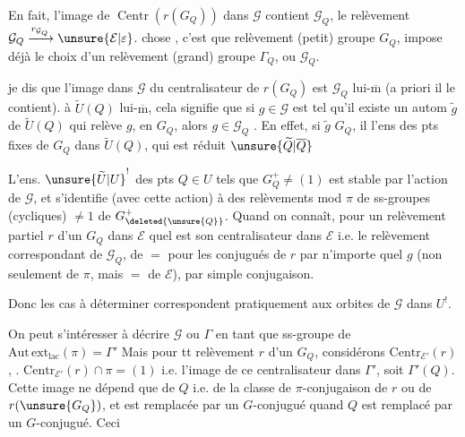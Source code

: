 En fait, l'image de $\operatorname{Centr}(r(G_Q))$ dans $\mathcal G$ contient $\mathcal G_Q$,    le relèvement $\mathcal G_Q\xrightarrow{r_{\mathcal G_Q}}\unsure{\mathcal E|\varepsilon}$.
 chose , c'est que   relèvement  (petit) groupe $G_Q$, impose déjà le choix d'un relèvement  (grand) groupe $\Gamma_Q$, ou $\mathcal G_Q$.

 je dis que l'image dans $\mathcal G$ du centralisateur  de $r(G_Q)$ est $\mathcal G_Q$ lui-$\overline{\mathrm m}$ (a priori il le contient).
 à $\widetilde U(Q)$ lui-$\overline{\mathrm m}$, cela signifie que  si $g\in\mathcal G$ est tel qu'il existe un autom $\widetilde g$ de $\widetilde U(Q)$ qui relève $g$, en     $G_Q$, alors $g\in\mathcal G_Q$ . En effet, si $\widetilde g$    $G_Q$, il  l'ens des pts fixes de $G_Q$ dans $\widetilde U(Q)$, qui est réduit   $\unsure{\widetilde Q|\overline Q}$

L'ens. $\unsure{\widetilde U|U}^{!}$ des pts $Q\in U$ tels que $G_Q^+\ne(1)$ est stable par l'action de $\mathcal G$, et s'identifie (avec cette action) à  des relèvements  mod $\pi$ de ss-groupes (cycliques) $\ne1$ de $G^{+}_{\deleted{\unsure{Q}}}$. Quand on connaît, pour un relèvement partiel $r$ d'un $G_Q$ dans $\mathcal E$ quel est son centralisateur dans $\mathcal E$ i.e. le relèvement correspondant de $\mathcal G_Q$,  de $=$ pour les conjugués de $r$ par n'importe quel  $g$ (non seulement de $\pi$, mais $=$ de $\mathcal E$), par simple conjugaison.

Donc les cas à déterminer correspondent pratiquement aux orbites de $\mathcal G$ dans $U^{!}$.

On peut s'intéresser à décrire $\mathcal G$ ou $\Gamma$ en tant que ss-groupe de $\mathrm{Aut\,ext}_{\mathrm{lac}}(\pi)=\Gamma'$  Mais pour tt relèvement $r$ d'un $G_Q$, considérons $\mathrm{Centr}_{\mathcal E'}(r)$,  .  $\mathrm{Centr}_{\mathcal E'}(r)\cap\pi=(1)$ i.e.  l'image de ce centralisateur dans $\Gamma'$, soit $\Gamma'(Q)$. Cette image ne dépend que de $Q$ i.e. de la classe de $\pi$-conjugaison de $r$ ou de $r(\unsure{G_Q})$, et est remplacée par un $G$-conjugué quand $Q$ est remplacé par un $G$-conjugué. Ceci


